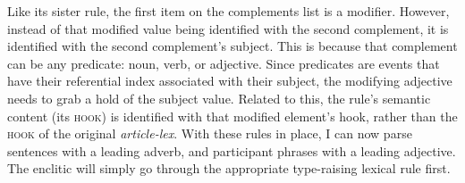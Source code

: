 \begin{singlespacing}
\ex \label{auxiliary-unary-type-raise-article}
\xe
\end{singlespacing}

Like its sister rule, the first item on the complements list is a modifier. However, instead of that modified value being identified with the second complement, it is identified with the second complement's subject. This is because that complement can be any predicate: noun, verb, or adjective. Since predicates are events that have their referential index associated with their subject, the modifying adjective needs to grab a hold of the subject value. Related to this, the rule's semantic content (its \textsc{hook}) is identified with that modified element's hook, rather than the \textsc{hook} of the original \textit{article-lex}. With these rules in place, I can now parse sentences with a leading adverb, and participant phrases with a leading adjective. The enclitic will simply go through the appropriate type-raising lexical rule first.

